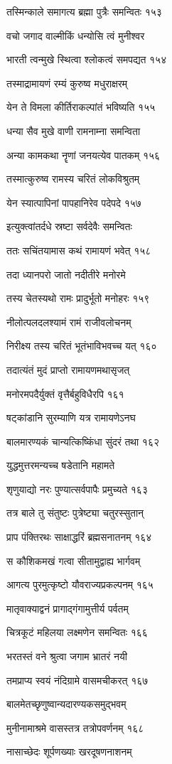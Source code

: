 तस्मिन्काले समागत्य ब्रह्मा पुत्रैः समन्वितः १५३

वचो जगाद वाल्मीकिं धन्योसि त्वं मुनीश्वर

भारती त्वन्मुखे स्थित्वा श्लोकत्वं समपद्यत १५४

तस्माद्रामायणं रम्यं कुरुष्व मधुराक्षरम्

येन ते विमला कीर्तिराकल्पांतं भविष्यति १५५

धन्या सैव मुखे वाणी रामनाम्ना समन्विता

अन्या कामकथा नॄणां जनयत्येव पातकम् १५६

तस्मात्कुरुष्व रामस्य चरितं लोकविश्रुतम्

येन स्यात्पापिनां पापहानिरेव पदेपदे १५७

इत्युक्त्वांतर्दधे स्रष्टा सर्वदेवैः समन्वितः

ततः सचिंतयामास कथं रामायणं भवेत् १५८

तदा ध्यानपरो जातो नदीतीरे मनोरमे

तस्य चेतस्यथो रामः प्रादुर्भूतो मनोहरः १५९

नीलोत्पलदलश्यामं रामं राजीवलोचनम्

निरीक्ष्य तस्य चरितं भूतंभाविभवच्च यत् १६०

तदात्यंतं मुदं प्राप्तो रामायणमथासृजत्

मनोरमपदैर्युक्तं वृत्तैर्बहुविधैरपि १६१

षट्कांडानि सुरम्याणि यत्र रामायणेऽनघ

बालमारण्यकं चान्यत्किष्किंधा सुंदरं तथा १६२

युद्धमुत्तरमन्यच्च षडेतानि महामते

शृणुयाद्यो नरः पुण्यात्सर्वपापैः प्रमुच्यते १६३

तत्र बाले तु संतुष्टः पुत्रेष्ट्या चतुरस्सुतान्

प्राप पंक्तिरथः साक्षाद्धरिं ब्रह्मसनातनम् १६४

स कौशिकमखं गत्वा सीतामुद्वाह्य भार्गवम्

आगत्य पुरमुत्कृष्टो यौवराज्यप्रकल्पनम् १६५

मातृवाक्याद्वनं प्रागाद्गंगामुत्तीर्य पर्वतम्

चित्रकूटं महिलया लक्ष्मणेन समन्वितः १६६

भरतस्तं वने श्रुत्वा जगाम भ्रातरं नयी

तमप्राप्य स्वयं नंदिग्रामे वासमचीकरत् १६७

बालमेतच्छृणुष्वान्यदारण्यकसमुद्भवम्

मुनीनामाश्रमे वासस्तत्र तत्रोपवर्णनम् १६८

नासाच्छेदः शूर्पणख्याः खरदूषणनाशनम्

